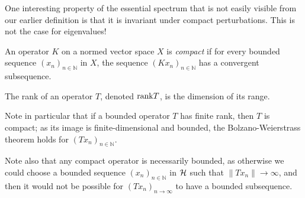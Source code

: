 \documentclass[../main.tex]{subfiles}
\begin{document}
One interesting property of the essential spectrum that is not easily visible
from our earlier definition is that it is invariant under compact perturbations.
This is not the case for eigenvalues!

\begin{definition}
  An operator $K$ on a normed vector space $X$ is \emph{compact} if for every
  bounded sequence $(x_n)_{n \in \mathbb{N}}$ in $X$, the sequence
  $(Kx_n)_{n \in \mathbb{N}}$ has a convergent subsequence.

  The rank of an operator $T$, denoted $\mathrm{rank} T$, is the dimension of its range.
\end{definition}

Note in particular that if a bounded operator $T$ has finite rank, then $T$ is
compact; as its image is finite-dimensional and bounded, the Bolzano-Weierstrass
theorem holds for $(Tx_n)_{n \in \mathbb{N}}$.

Note also that any compact operator is necessarily bounded, as otherwise we
could choose a bounded sequence $(x_n)_{n \in \mathbb{N}}$ in $\mathcal{H}$ such
that $\|Tx_n\| \rightarrow \infty$, and then it would not be possible for
$(Tx_n)_{n \rightarrow \infty}$ to have a bounded subsequence. 
\end{document}
